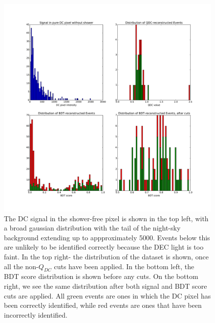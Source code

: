 \documentclass[]{article}
\begin{document}
\begin{figure}
\begin{center}
\includegraphics[width=\textwidth]{cutdistribution1None}
\caption{The DC signal in the shower-free pixel is shown in the top left, with a broad gaussian distribution with the tail of the night-sky background extending up to appproximately 5000. Events below this are unlikely to be identified correctly because the DEC light is too faint. In the top right- the distribution of the dataset is shown, once all the non-$Q_{DC}$ cuts have been applied. In the bottom left, the BDT score distribution is shown before any cuts. On the bottom right, we see the same distribution after both signal and BDT score cuts are applied. All green events are ones in which the DC pixel has been correctly identified, while red events are ones that have been incorrectly identified.}
\label{fig:cutdistribution}
\end{center}
\end{figure} 
\end{document}

